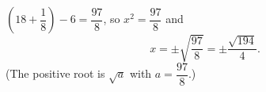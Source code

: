 $\left(18+\dfrac18\right)-6=\dfrac{97}{8}$, so $x^2=\dfrac{97}8$ and
\[x=\pm\sqrt{\dfrac{97}{8}}=\boxed{\pm\dfrac{\sqrt{194}}{4}}.\]
(The positive root is $\sqrt a$ with $a=\dfrac{97}{8}$.)

